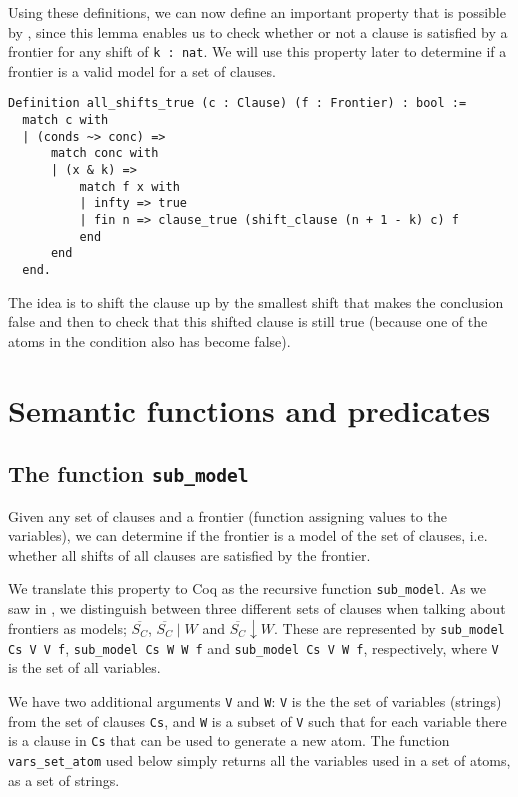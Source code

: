 Using these definitions, we can now define an important property that is
possible by  \cite[p.~3]{mbezem}, since this lemma enables us to check whether or not a clause
is satisfied by a frontier for any shift of \lstinline{k : nat}.
We will use this property later to determine if a frontier is a valid model for a set of clauses.

\begin{minipage}{\linewidth}
\begin{lstlisting}[language=Coq, label={lst:all_shifts_true}, caption={\lstinline{all_shifts_true} in Coq}]
Definition all_shifts_true (c : Clause) (f : Frontier) : bool :=
  match c with
  | (conds ~> conc) =>
      match conc with
      | (x & k) =>
          match f x with
          | infty => true
          | fin n => clause_true (shift_clause (n + 1 - k) c) f
          end
      end
  end.
\end{lstlisting}
\end{minipage}

The idea is to shift the clause up by the smallest shift that makes the conclusion false
and then to check that this shifted clause is still true
(because one of the atoms in the condition also has become false).

\section{Semantic functions and predicates}

\subsection{The function \lstinline{sub_model}}

Given any set of clauses and a frontier (function assigning values to the variables),
we can determine if the frontier is a model of the set of clauses, i.e.
whether all shifts of all clauses are satisfied by the frontier.

We translate this property to Coq as the recursive function \lstinline{sub_model}.
As we saw in , we distinguish
between three different sets of clauses when talking about frontiers as models;
$\overline{S_C}$, $\overline{S_C}\mid W$ and $\overline{S_C}\downarrow W$.
These are represented by
\lstinline{sub_model Cs V V f}, \lstinline{sub_model Cs W W f} and \lstinline{sub_model Cs V W f},
respectively, where \lstinline{V} is the set of all variables.

We have two additional arguments \lstinline{V} and \lstinline{W}:
\lstinline{V} is the the set of variables (strings) from the set of clauses \lstinline{Cs},
and \lstinline{W} is a subset of \lstinline{V} such that for each variable
there is a clause in \lstinline{Cs} that can be used to generate a new atom.
The function \lstinline{vars_set_atom} used below simply returns all the variables
used in a set of atoms, as a set of strings.

